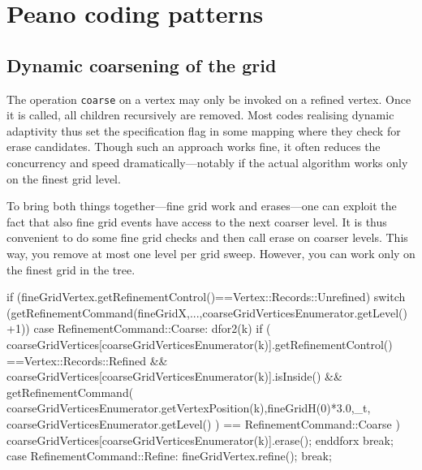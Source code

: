\chapter{Peano coding patterns}

\section{Dynamic coarsening of the grid}

The operation \texttt{coarse} on a vertex may only be invoked on a refined
vertex.
Once it is called, all children recursively are removed.
Most codes realising dynamic adaptivity thus set the specification flag
 in some mapping where they check for erase candidates.
Though such an approach works fine, it often reduces the concurrency and speed
dramatically---notably if the actual algorithm works only on the finest grid
level. 


To bring both things together---fine grid work and erases---one can exploit the
fact that also fine grid events have access to the next coarser level. 
It is thus convenient to do some fine grid checks and then call erase on coarser
levels.
This way, you remove at most one level per grid sweep. 
However, you can work only on the finest grid in the tree.

\begin{code}
if (fineGridVertex.getRefinementControl()==Vertex::Records::Unrefined) {
 switch (getRefinementCommand(fineGridX,...,coarseGridVerticesEnumerator.getLevel()+1)) { 
  case RefinementCommand::Coarse:
   {
    dfor2(k)
     if (
      coarseGridVertices[coarseGridVerticesEnumerator(k)].getRefinementControl()
        ==Vertex::Records::Refined
      &&
      coarseGridVertices[coarseGridVerticesEnumerator(k)].isInside()
      &&
      getRefinementCommand(
       coarseGridVerticesEnumerator.getVertexPosition(k),fineGridH(0)*3.0,_t,
         coarseGridVerticesEnumerator.getLevel()
      ) == RefinementCommand::Coarse
     ) {
      coarseGridVertices[coarseGridVerticesEnumerator(k)].erase();
     }
    enddforx
   }
   break;
   case RefinementCommand::Refine:
    fineGridVertex.refine();
    break;
 }
}
\end{code}


